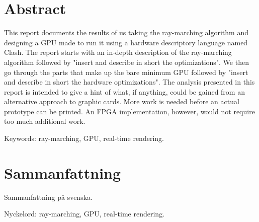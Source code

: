 \thispagestyle{plain}			%
\setlength{\parskip}{0pt plus 1.0pt}
\section*{Abstract}

	This report documents the results of us taking the ray-marching algorithm
	and designing a GPU made to run it using a hardware descriptory language
	named Clash.\cite{Raa2015a} The report starts with an in-depth description
	of the ray-marching algorithm followed by "insert and describe in short the
	optimizations". We then go through the parts that make up the bare minimum
	GPU followed by "insert and describe in short the hardware optimizations".
	The analysis presented in this report is intended to give a hint of what,
	if anything, could be gained from an alternative approach to graphic cards.
	More work is needed before an actual prototype can be printed. An FPGA
	implementation, however, would not require too much additional work.

	\vfill
	Keywords: ray-marching, GPU, real-time rendering.

\newpage
\thispagestyle{plain}

\section*{Sammanfattning}
	
	Sammanfattning på svenska.
	
	\vfill
	Nyckelord: ray-marching, GPU, real-time rendering.


\newpage
\thispagestyle{empty}
\mbox{}

